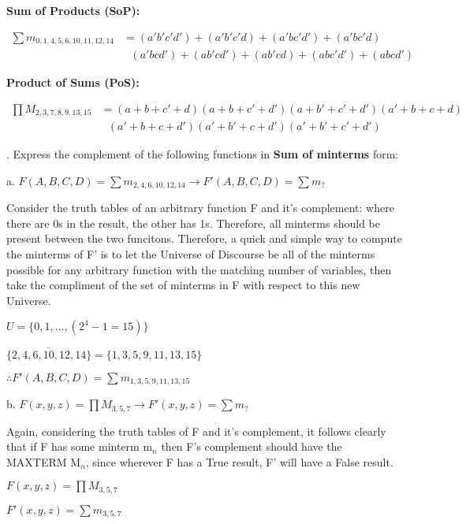 \documentclass[12pt]{book}
\newenvironment{indented}[1] {
	\begin{list}{}{\setlength{\leftmargin}{#1}}
		\item[]
	}{\end{list}}
\begin{document}
\begin{indented}{5mm}
\begin{indented}{5mm}
			\textbf{Sum of Products (SoP):}
			\begin{indented}{5mm}
				$\begin{aligned}
					\textstyle\sum m_{0, 1, 4, 5, 6, 10, 11, 12, 14} &= (a'b'c'd')+(a'b'c'd)+(a'bc'd')+(a'bc'd)\\
					&\text{\ \ \ \ }(a'bcd')+(ab'cd')+(ab'cd)+(abc'd')+(abcd')
				\end{aligned}$
			\end{indented}

			\textbf{Product of Sums (PoS):}
			\begin{indented}{5mm}
				$\begin{aligned}
					\textstyle\prod M_{2, 3, 7, 8, 9, 13, 15} &= (a+b+c'+d)(a+b+c'+d')(a+b'+c'+d')(a'+b+c+d)\\
					&\text{\ \ \ \ }(a'+b+c+d')(a'+b'+c+d')(a'+b'+c'+d')
				\end{aligned}$
			\end{indented}
		\end{indented}
	\end{indented}

	. Express the complement of the following functions in \textbf{Sum of minterms} form:
	\begin{indented}{5mm}
		a. $F(A,B,C,D) = \sum m_{2, 4, 6, 10, 12, 14} \to F'(A,B,C,D) = \sum m_?$
		\begin{indented}{5mm}
			Consider the truth tables of an arbitrary function F and it's complement: where there are 0s in the result, 
			the other has 1s. Therefore, all minterms should be present between the two funcitons. Therefore, a quick
			and simple way to compute the minterms of F' is to let the Universe of Discourse be all of the minterms possible
			for any arbitrary function with the matching number of variables, then take the compliment of the set of minterms
			in F with respect to this new Universe.

			$U = \{0, 1, \dots, (2^4 - 1 = 15)\}$
			
			$\overline{\{2, 4, 6, 10, 12, 14\}} = \{1, 3, 5, 9, 11, 13, 15\}$
			
			\medskip
			$\therefore F'(A,B,C,D) = \sum m_{1, 3, 5, 9, 11, 13, 15}$
		\end{indented}

		\pagebreak

		b. $F(x,y,z) = \prod M_{3, 5, 7} \to F'(x,y,z) = \sum m_?$
		\begin{indented}{5mm}
			Again, considering the truth tables of F and it's complement, it follows clearly that
			if F has some minterm m$_n$ then F's complement should have the MAXTERM M$_n$, since
			wherever F has a True result, F' will have a False result.

			$F(x,y,z) = \prod M_{3, 5, 7}$

			$F'(x,y,z) = \sum m_{3, 5, 7}$
		\end{indented}
	\end{indented}
\end{document}
